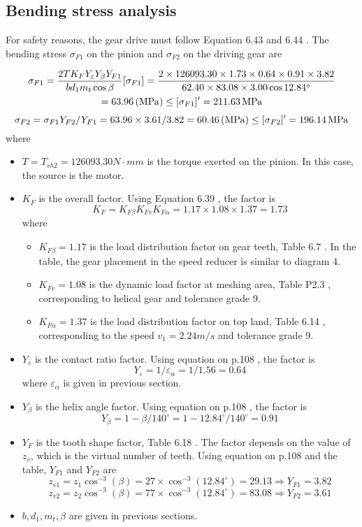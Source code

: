 \subsection{Bending stress analysis}
For safety reasons, the gear drive must follow Equation 6.43 and 6.44 \cite{tk1}. The bending stress $ \sigma_{F1} $ on the pinion and $ \sigma_{F2} $ on the driving gear are

\begin{multline*}
\sigma_{F1} = \dfrac{2TK_FY_\varepsilon Y_\beta Y_{F1}}{bd_1m_t\cos\beta} [\sigma_{F1}]= \dfrac{2\times 126093.30 \times 1.73 \times 0.64 \times 0.91 \times 3.82}{62.40 \times 83.08 \times 3.00 \cos 12.84^\circ}\\
= 63.96 \, (\mathrm{MPa}) \leq [\sigma_{F1}]' = 211.63 \, \mathrm{MPa}
\end{multline*}
\[\sigma_{F2} = \sigma_{F1}Y_{F2}/Y_{F1} = {63.96 \times 3.61}/3.82 = 60.46 \, (\mathrm{MPa}) \leq [\sigma_{F2}]' = 196.14 \, \mathrm{MPa}\]
where
\begin{itemize}
	\item $ T=T_{sh2}=126093.30\unit{N\cdot mm} $ is the torque exerted on the pinion. In this case, the source is the motor.
	\item $ K_F $ is the overall factor. Using Equation 6.39 \cite{tk1}, the factor is
	\[ K_F = K_{F\beta}K_{Fv}K_{F\alpha} = 1.17 \times 1.08 \times 1.37 = 1.73 \]
	where
	\begin{itemize}
		\item $ K_{F\beta} = 1.17 $ is the load distribution factor on gear teeth, Table 6.7 \cite{tk1}. In the table, the gear placement in the speed reducer is similar to diagram 4.
		\item $ K_{Fv} = 1.08 $ is the dynamic load factor at meshing area, Table P2.3 \cite{tk1}, corresponding to helical gear and tolerance grade 9.
		\item $ K_{F\alpha} = 1.37 $ is the load distribution factor on top land, Table 6.14 \cite{tk1}, corresponding to the speed $ v_1=2.24 \unit{m/s} $ and tolerance grade 9.
	\end{itemize}
	\item $ Y_\varepsilon $ is the contact ratio factor. Using equation on p.108 \cite{tk1}, the factor is
	\[ Y_\varepsilon = 1/\varepsilon_\alpha = 1/1.56 = 0.64 \]
	where $ \varepsilon_\alpha $ is given in previous section.
	\item $ Y_\beta $ is the helix angle factor. Using equation on p.108 \cite{tk1}, the factor is
	\[ Y_\beta = 1-{\beta}/{140^\circ}=  1-{12.84^\circ}/{140^\circ}= 0.91 \]
	\item $ Y_F $ is the tooth shape factor, Table 6.18 \cite{tk1}. The factor depends on the value of $ z_v $, which is the virtual number of teeth. Using equation on p.108 \cite{tk1} and the table, $ Y_{F1} $ and $ Y_{F2} $ are
	\[ z_{v1} = z_1\cos^{-3}(\beta) = 27\times\cos^{-3}(12.84^\circ) = 29.13\Rightarrow Y_{F1} = 3.82\]
	\[ z_{v2} = z_2\cos^{-3}(\beta) = 77\times\cos^{-3}(12.84^\circ) = 83.08\Rightarrow Y_{F2} = 3.61\]
	\item $ b,d_1,m_t,\beta $ are given in previous sections.
\end{itemize}

